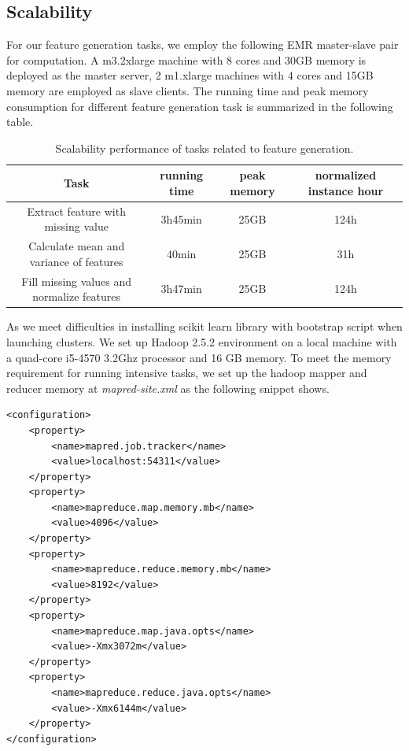 \subsection{Scalability}
For our feature generation tasks, we employ the following EMR master-slave pair for computation. A m3.2xlarge machine with 8 cores and 30GB memory is deployed as the master server, 2 m1.xlarge machines with 4 cores and	15GB memory are employed as slave clients. The running time and peak memory consumption for different feature generation task is summarized in the following table.

\begin{table}[H]
    \begin{tabular}{| c | c | c | c |}
    \hline
    Task & running time & peak memory & normalized instance hour \\
    \hline
    \hline
    Extract feature with missing value & 3h45min & 25GB & 124h\\
    \hline
    Calculate mean and variance of features & 40min & 25GB & 31h\\
    \hline
    Fill missing values and normalize features & 3h47min & 25GB & 124h\\
    \hline
    \end{tabular}
    \caption{Scalability performance of tasks related to feature generation.}
    \label{tbl:PerfTable}
\end{table}

As we meet difficulties in installing scikit learn library with bootstrap script when launching clusters. We set up Hadoop 2.5.2 environment on a local machine with a quad-core i5-4570 3.2Ghz processor and 16 GB memory. To meet the memory requirement for running intensive tasks, we set up the hadoop mapper and reducer memory at \textit{mapred-site.xml } as the following snippet shows.

\begin{lstlisting}
<configuration>
    <property>
        <name>mapred.job.tracker</name>
        <value>localhost:54311</value>
    </property>
    <property>
        <name>mapreduce.map.memory.mb</name>
        <value>4096</value>
    </property>
    <property>
        <name>mapreduce.reduce.memory.mb</name>
        <value>8192</value>
    </property>
    <property>
        <name>mapreduce.map.java.opts</name>
        <value>-Xmx3072m</value>
    </property>
    <property>
        <name>mapreduce.reduce.java.opts</name>
        <value>-Xmx6144m</value>
    </property>
</configuration>

\end{lstlisting}
